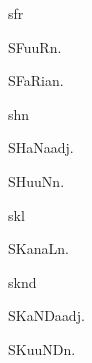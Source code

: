 \begin{multicols*}{2}
\begin{dictroot}{sf}{r}
    \begin{dictentry}{SFuuR}{n.}
    \end{dictentry}
    \begin{dictentry}{SFaRia}{n.}
    \end{dictentry}
\end{dictroot}

\begin{dictroot}{sh}{n}
    \begin{dictentry}{SHaNa}{adj.}
    \end{dictentry}
    \begin{dictentry}{SHuuN}{n.}
    \end{dictentry}
\end{dictroot}

\begin{dictroot}{sk}{l}
    \begin{dictentry}{SKanaL}{n.}
    \end{dictentry}
\end{dictroot}

\begin{dictroot}{sk}{nd}
    \begin{dictentry}{SKaNDa}{adj.}
    \end{dictentry}
    \begin{dictentry}{SKuuND}{n.}
    \end{dictentry}
\end{dictroot}


\end{multicols*}
